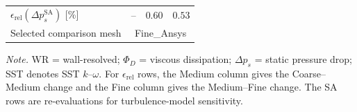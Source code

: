 \begin{table}[htbp]
\begin{tabular*}{\textwidth}{@{\extracolsep{\fill}}lccc@{}}
		$\epsilon_{\mathrm{rel}}(\Delta p_s^{\mathrm{SA}})$ [\%] & -- & $0.60$ & $0.53$ \\
		Selected comparison mesh & \multicolumn{3}{c}{Fine\_Ansys} \\
		\hline
	\end{tabular*}
	\vspace{2pt}
	\begin{minipage}{0.98\textwidth}
		\scriptsize \textit{Note.} WR = wall-resolved; $\Phi_D$ = viscous dissipation; $\Delta p_s$ = static pressure drop; SST denotes SST $k$--$\omega$. For $\epsilon_{\mathrm{rel}}$ rows, the Medium column gives the Coarse--Medium change and the Fine column gives the Medium--Fine change. The SA rows are re-evaluations for turbulence-model sensitivity.
	\end{minipage}
\end{table}

\FloatBarrier
